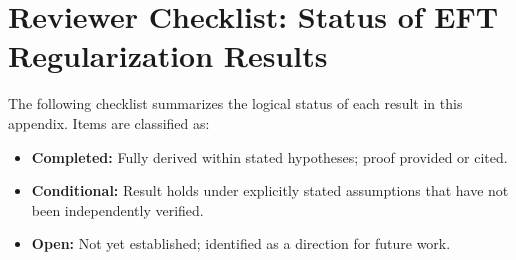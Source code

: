 \documentclass[12pt,openany]{book}
\theoremstyle{plain}
\theoremstyle{definition}
\theoremstyle{remark}
\begin{document}
%
%


\section*{Reviewer Checklist: Status of EFT Regularization Results}
\label{sec:reviewer-checklist}

\noindent
The following checklist summarizes the logical status of each result in
this appendix.  Items are classified as:
\begin{itemize}
  \item[\checkmark] \textbf{Completed:} Fully derived within stated
    hypotheses; proof provided or cited.
  \item[$\boldsymbol{\sim}$] \textbf{Conditional:} Result holds under
    explicitly stated assumptions that have not been independently
    verified.
  \item[$\circ$] \textbf{Open:} Not yet established; identified as a
    direction for future work.
\end{itemize}

\bigskip
\end{document}
